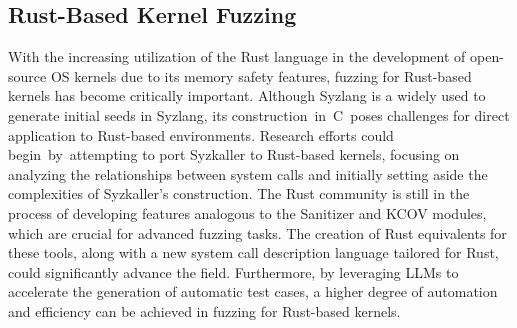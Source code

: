 \subsection{Rust-Based Kernel Fuzzing}

With the increasing utilization of the Rust language in the development of open-source OS kernels due to its memory safety features, fuzzing for Rust-based kernels has become critically important. Although Syzlang is a widely used to generate initial seeds in Syzlang, its construction~in~C~poses challenges for direct application to Rust-based environments. Research efforts could begin~by~attempting to port Syzkaller to Rust-based kernels, focusing on analyzing the relationships between system calls and initially setting aside the complexities of Syzkaller's construction. The Rust community is still in the process of developing features analogous to the Sanitizer and KCOV modules, which are crucial for advanced fuzzing tasks. The creation of Rust equivalents for these tools, along with a new system call description language tailored for Rust, could significantly advance the field. Furthermore, by leveraging LLMs to accelerate the generation of automatic test cases, a higher degree of automation and efficiency can be achieved in fuzzing for Rust-based kernels.

